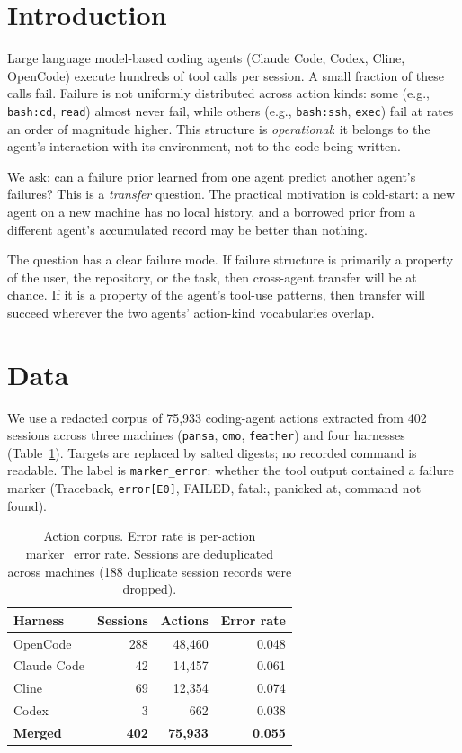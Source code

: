\documentclass[11pt]{article}
\begin{document}
\section{Introduction}

Large language model-based coding agents (Claude Code, Codex, Cline,
OpenCode) execute hundreds of tool calls per session. A small fraction of
these calls fail. Failure is not uniformly distributed across action kinds:
some (e.g., \texttt{bash:cd}, \texttt{read}) almost never fail, while
others (e.g., \texttt{bash:ssh}, \texttt{exec}) fail at rates an order of
magnitude higher. This structure is \emph{operational}: it belongs to the
agent's interaction with its environment, not to the code being written.

We ask: can a failure prior learned from one agent predict another agent's
failures? This is a \emph{transfer} question. The practical motivation is
cold-start: a new agent on a new machine has no local history, and a
borrowed prior from a different agent's accumulated record may be better
than nothing.

The question has a clear failure mode. If failure structure is primarily a
property of the user, the repository, or the task, then cross-agent transfer
will be at chance. If it is a property of the agent's tool-use patterns,
then transfer will succeed wherever the two agents' action-kind vocabularies
overlap.

\section{Data}

We use a redacted corpus of 75,933 coding-agent actions extracted from
402 sessions across three machines (\texttt{pansa}, \texttt{omo},
\texttt{feather}) and four harnesses (Table~\ref{tab:corpus}). Targets
are replaced by salted digests; no recorded command is readable. The
label is \texttt{marker\_error}: whether the tool output contained a
failure marker (Traceback, \texttt{error[E0]}, FAILED, fatal:, panicked at,
command not found).

\begin{table}[h]
\centering
\begin{tabular}{lrrr}
\toprule
\textbf{Harness} & \textbf{Sessions} & \textbf{Actions} & \textbf{Error rate} \\
\midrule
OpenCode & 288 & 48,460 & 0.048 \\
Claude Code & 42 & 14,457 & 0.061 \\
Cline & 69 & 12,354 & 0.074 \\
Codex & 3 & 662 & 0.038 \\
\midrule
\textbf{Merged} & \textbf{402} & \textbf{75,933} & \textbf{0.055} \\
\bottomrule
\end{tabular}
\caption{Action corpus. Error rate is per-action marker\_error rate.
Sessions are deduplicated across machines (188 duplicate session records
were dropped).}
\label{tab:corpus}
\end{table}
\end{document}
